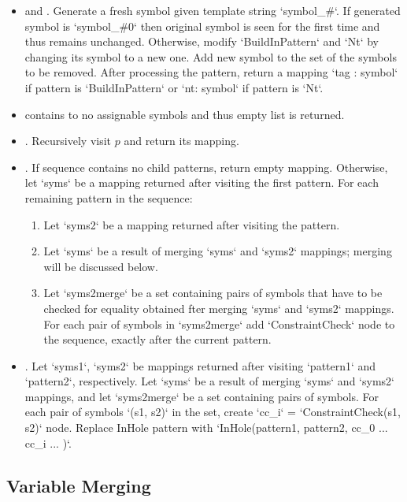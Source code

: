 \begin{itemize}
\item
\BuiltInPattern and \Nt. Generate a fresh symbol given template string `symbol\_\#`. If generated symbol is `symbol\_\#0` then original symbol is seen for the first time and thus remains unchanged. Otherwise, modify `BuildInPattern` and `Nt` by changing its symbol to a new one. Add new symbol to the set of the symbols to be removed. After processing the pattern, return a mapping `{tag : symbol}` if pattern is `BuildInPattern` or `{nt: symbol}` if pattern is `Nt`.

\item
\LiteralPattern contains to no assignable symbols and thus empty list is returned.

\item
\Repeat. Recursively visit $p$ and return its mapping. 

\item
\PatternSequence. If sequence contains no child patterns, return empty mapping. Otherwise, let `syms` be a mapping returned after visiting the first pattern. For each remaining pattern in the sequence:
	\begin{enumerate}
	\item
	Let `syms2` be a mapping returned after visiting the pattern.
	\item
	Let `syms` be a result of merging `syms` and `syms2` mappings; merging will be discussed below.
	\item
	Let `syms2merge` be a set containing pairs of symbols that have to be checked for equality obtained fter merging `syms` and `syms2` mappings. For each pair of symbols in `syms2merge` add `ConstraintCheck` node to the sequence, exactly after the current pattern. 
	\end{enumerate}

\item
\InHolePattern. Let `syms1`, `syms2` be mappings returned after visiting `pattern1` and `pattern2`, respectively. Let `syms` be a result of merging `syms` and `syms2` mappings, and let `syms2merge` be a set containing pairs of symbols. For each pair of symbols `(s1, s2)` in the set, create `cc\_i` = `ConstraintCheck(s1, s2)` node. Replace InHole pattern with `InHole(pattern1, pattern2, {cc\_0 ... cc\_i ... })`.
\end{itemize}

\subsection{Variable Merging}


